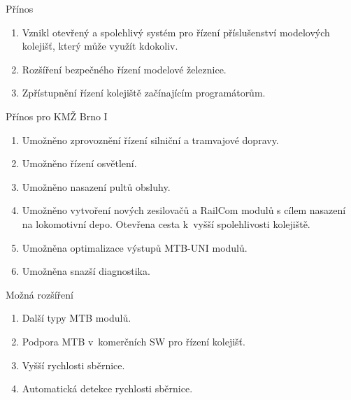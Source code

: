 \documentclass[aspectratio=169]{beamer}
\begin{document}
\begin{frame}{Přínos}
\begin{enumerate}
	\item Vznikl otevřený a spolehlivý systém pro řízení příslušenství modelových
		kolejišť, který může využít kdokoliv.
	\item Rozšíření bezpečného řízení modelové železnice.
	\item Zpřístupnění řízení kolejiště začínajícím programátorům.
\end{enumerate}

\begin{alertblock}{Přínos pro KMŽ Brno I}
\begin{enumerate}
\item Umožněno zprovoznění řízení silniční a tramvajové dopravy.
\item Umožněno řízení osvětlení.
\item Umožněno nasazení pultů obsluhy.
\item Umožněno vytvoření nových zesilovačů a RailCom modulů s cílem nasazení
	na lokomotivní depo. Otevřena cesta k vyšší spolehlivosti kolejiště.
\item Umožněna optimalizace výstupů MTB-UNI modulů.
\item Umožněna snazší diagnostika.
\end{enumerate}
\end{alertblock}
\end{frame}

\begin{frame}{Možná rozšíření}
\begin{enumerate}
\item Další typy MTB modulů.
\item Podpora MTB v komerčních SW pro řízení kolejišť.
\item Vyšší rychlosti sběrnice.
\item Automatická detekce rychlosti sběrnice.
\end{enumerate}
\end{frame}



\end{document}
